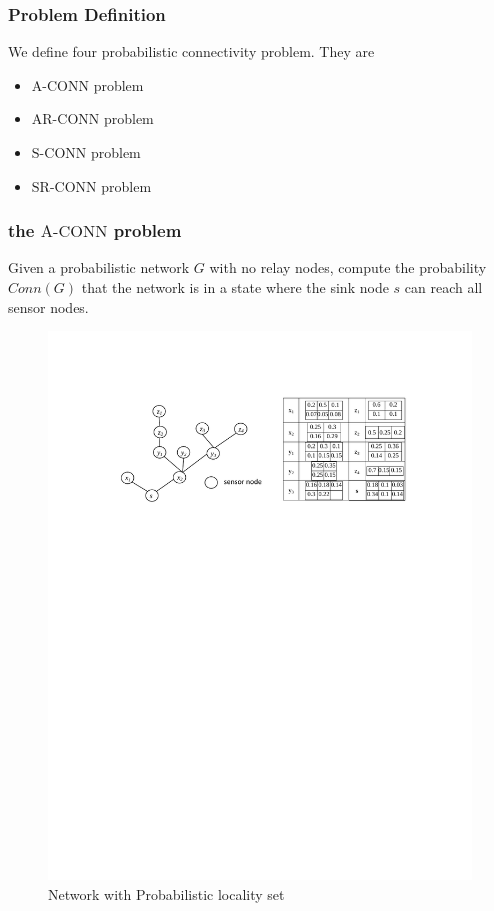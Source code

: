 \documentclass{beamer}
\newcommand{\ACONN}   { {\mathrm {A\mbox{-}CONN}} }
\newcommand{\SCONN}   { {\mathrm {S\mbox{-}CONN}} }
\newcommand{\ARCONN}   { {\mathrm {AR\mbox{-}CONN}} }
\newcommand{\SRCONN}   { {\mathrm {SR\mbox{-}CONN}} }
\begin{document}
\begin{frame}
\frametitle{Problem Definition}
We define four probabilistic connectivity problem. They are 
\begin{itemize}
\item $\ACONN$ problem
\item $\ARCONN$ problem
\item $\SCONN$ problem
\item $\SRCONN$ problem
\end{itemize}
\end{frame}
\begin{frame}
\frametitle{the $\ACONN$ problem}
\begin{definition}
\normalfont
Given a probabilistic network $G$ with no relay nodes, compute the probability $Conn(G)$ that the network is in a state where the sink node $s$ can reach all sensor nodes. 
\end{definition}
\begin{figure}
\includegraphics[width=4 in, height=1.5 in]{ACONN.pdf}
\caption{Network with Probabilistic locality set}
\end{figure}
\end{frame}



\end{document}
